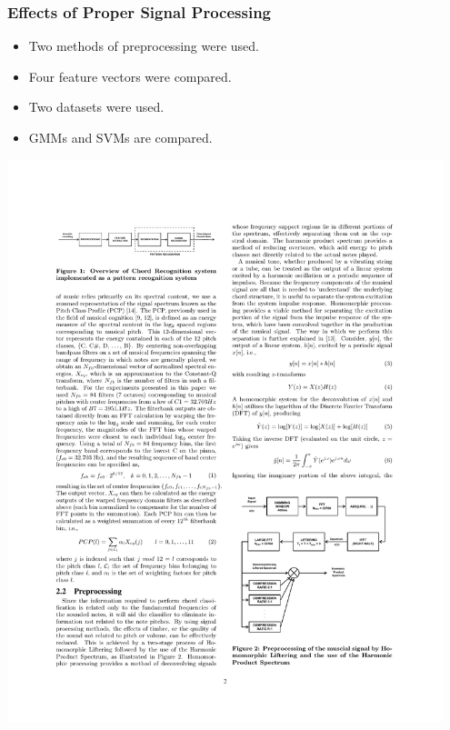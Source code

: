 \documentclass{beamer}
\begin{document}
\begin{frame}
  \frametitle{Effects of Proper Signal Processing}
	\begin{itemize}
		\item Two methods of preprocessing were used.
		\item Four feature vectors were compared.
		\item Two datasets were used.
		\item GMMs and SVMs are compared.
	\end{itemize}
 
 \includegraphics[width=0.95\textwidth]{fig2.pdf}
\end{frame}
\end{document}
